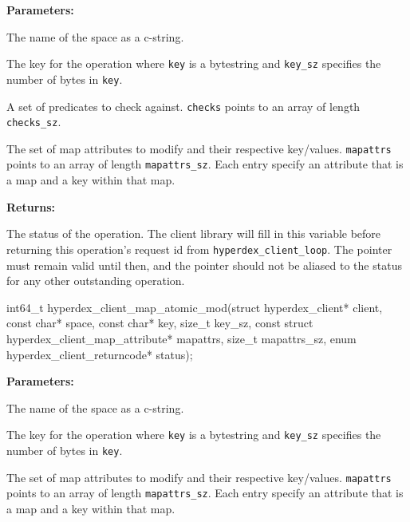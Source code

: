 \noindent\textbf{Parameters:}
\begin{description}[labelindent=\widthof{{\texttt{mapattrs}, \texttt{mapattrs\_sz}}},leftmargin=*,noitemsep,nolistsep,align=right]
\item[\texttt{space}] The name of the space as a c-string.
\item[\texttt{key}, \texttt{key\_sz}] The key for the operation where \texttt{key} is a bytestring and \texttt{key\_sz} specifies the number of bytes in \texttt{key}.
\item[\texttt{checks}, \texttt{checks\_sz}] A set of predicates to check against.  \texttt{checks} points to an array of length \texttt{checks\_sz}.
\item[\texttt{mapattrs}, \texttt{mapattrs\_sz}] The set of map attributes to modify and their respective key/values.  \texttt{mapattrs} points to an array of length \texttt{mapattrs\_sz}.  Each entry specify an attribute that is a map and a key within that map.
\end{description}

\noindent\textbf{Returns:}
\begin{description}[labelindent=\widthof{{\texttt{status}}},leftmargin=*,noitemsep,nolistsep,align=right]
\item[\texttt{status}] The status of the operation.  The client library will fill in this variable before returning this operation's request id from \texttt{hyperdex\_client\_loop}.  The pointer must remain valid until then, and the pointer should not be aliased to the status for any other outstanding operation.
\end{description}

\funcsep
\begin{ccode}
int64_t hyperdex_client_map_atomic_mod(struct hyperdex_client* client,
                const char* space,
                const char* key, size_t key_sz,
                const struct hyperdex_client_map_attribute* mapattrs, size_t mapattrs_sz,
                enum hyperdex_client_returncode* status);
\end{ccode}
\funcdesc 

\noindent\textbf{Parameters:}
\begin{description}[labelindent=\widthof{{\texttt{mapattrs}, \texttt{mapattrs\_sz}}},leftmargin=*,noitemsep,nolistsep,align=right]
\item[\texttt{space}] The name of the space as a c-string.
\item[\texttt{key}, \texttt{key\_sz}] The key for the operation where \texttt{key} is a bytestring and \texttt{key\_sz} specifies the number of bytes in \texttt{key}.
\item[\texttt{mapattrs}, \texttt{mapattrs\_sz}] The set of map attributes to modify and their respective key/values.  \texttt{mapattrs} points to an array of length \texttt{mapattrs\_sz}.  Each entry specify an attribute that is a map and a key within that map.
\end{description}


